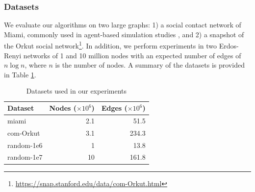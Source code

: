 \subsubsection{Datasets}
We evaluate our algorithms on two large graphs: 1) a social contact network of Miami, commonly used in agent-based simulation studies \cite{barrett2009generation}, and 2) a snapshot of the Orkut social network\footnote{\url{https://snap.stanford.edu/data/com-Orkut.html}}. In addition, we perform experiments in two Erdos-Renyi networks of 1 and 10 million nodes with an expected number of edges of $n\log n$, where $n$ is the number of nodes. A summary of the datasets is provided in Table \ref{table:datasets}.

\begin{table}[ht]
\centering \caption{\small Datasets used in our experiments}
\vspace{-.1in}
\label{table:datasets}
\begin{tabular}{|l|r|r|}
\hline
\textbf{Dataset}  & \textbf{Nodes ($\times 10^6$)} & \textbf{Edges ($\times 10^6$)} \\
\hline
miami & 2.1 & 51.5\\
\hline
com-Orkut  & 3.1 & 234.3\\
\hline
random-1e6 & 1 & 13.8\\
\hline
random-1e7 & 10 & 161.8\\
\hline
\end{tabular}
\end{table}

